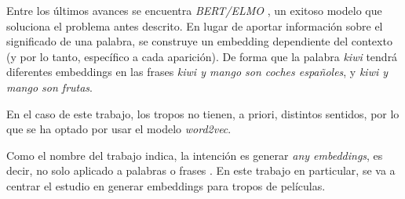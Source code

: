 Entre los últimos avances se encuentra \emph{BERT/ELMO} \cite{bert}, un exitoso modelo que soluciona el
problema antes descrito. En lugar de aportar información sobre el significado de una palabra, se construye
un embedding dependiente del contexto (y por lo tanto, específico a cada aparición). De forma que la palabra
\emph{kiwi} tendrá diferentes embeddings en las frases \emph{kiwi y mango son coches españoles}, y
\emph{kiwi y mango son frutas}.

En el caso de este trabajo, los tropos no tienen, a priori, distintos sentidos, por lo que se ha optado
por usar el modelo \emph{word2vec}.

Como el nombre del trabajo indica, la intención es generar \textit{any embeddings}, es decir, no solo aplicado a
palabras \cite{word2vec:1} \cite{word2vec:2} o frases \cite{kiros2015skip}. En este trabajo en particular, se va a centrar
el estudio en generar embeddings para tropos de películas.
